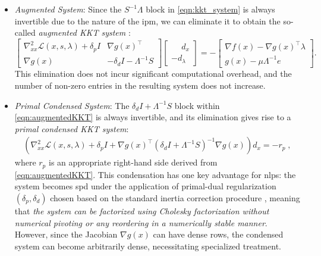 \documentclass{article}
\begin{document}
\begin{itemize}[leftmargin=*,itemsep=0pt,parsep=0pt,partopsep=0pt]
\item \textit{Augmented System}:
Since the \(S^{-1}\Lambda\) block in \cref{eqn:kkt_system} is always invertible due to the nature of the \gls*{ipm}, we can eliminate it to obtain the so-called \emph{augmented KKT system} \cite{nocedalNumericalOptimization2006}:
\begin{equation}\label{eqn:augmentedKKT}
  \begin{bmatrix}
    \nabla^2_{xx} \mathcal{L}(x,s,\lambda) + \delta_p I & \nabla g(x)^\top \\
    \nabla g(x) &  - \delta_d I - \Lambda^{-1} S
  \end{bmatrix}
  \begin{bmatrix}
    \phantom{-}d_x\\
    - d_\lambda
  \end{bmatrix} =
  -\begin{bmatrix}
    \nabla f(x) - \nabla g(x)^\top \lambda\\
    g(x) - \mu \Lambda^{-1} e
  \end{bmatrix}.
\end{equation}
This elimination does not incur significant computational overhead, and the number of non-zero entries in the resulting system does not increase.

\item \textit{Primal Condensed System}:
The \(\delta_d I + \Lambda^{-1}S\) block within \cref{eqn:augmentedKKT} is always invertible, and its elimination gives rise to a \emph{primal condensed KKT system}:
\begin{align}\label{eqn:kkt_primal}
  \left(\nabla^2_{xx} \mathcal{L}(x,s,\lambda) + \delta_p I + \nabla g(x)^\top (\delta_d I + \Lambda^{-1} S)^{-1} \nabla g(x) \right) d_x = - r_p \; ,
\end{align}
where \(r_p\) is an appropriate right-hand side derived from \cref{eqn:augmentedKKT}. This condensation has one key advantage for \glspl*{nlp}: the system becomes \gls*{spd} under the application of primal-dual regularization \((\delta_p, \delta_d)\) chosen based on the standard inertia correction procedure \cite{shinAcceleratingOptimalPower2024}, meaning that \emph{the system can be factorized using Cholesky factorization without numerical pivoting or any reordering in a numerically stable manner}. However, since the Jacobian \(\nabla g(x)\) can have dense rows, the condensed system can become arbitrarily dense, necessitating specialized treatment.


\end{itemize}
\end{document}
